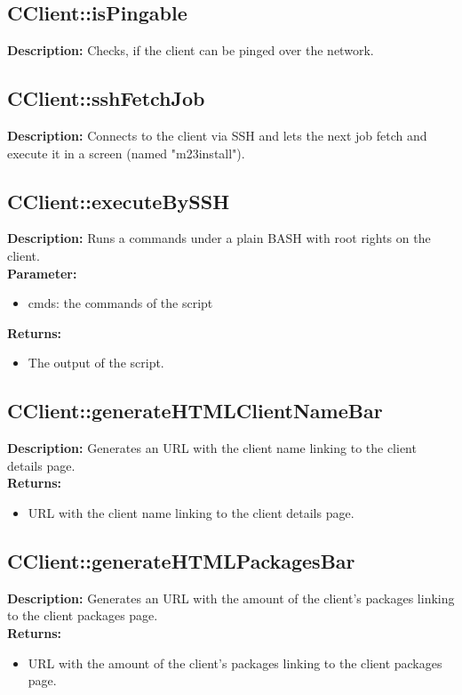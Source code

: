 \subsection{CClient::isPingable}
\textbf{Description:} Checks, if the client can be pinged over the network.\\

\subsection{CClient::sshFetchJob}
\textbf{Description:} Connects to the client via SSH and lets the next job fetch and execute it in a screen (named "m23install").\\

\subsection{CClient::executeBySSH}
\textbf{Description:} Runs a commands under a plain BASH with root rights on the client.\\
\textbf{Parameter:}
\begin{itemize}
\item cmds: the commands of the script 
\end{itemize}
\textbf{Returns:}
\begin{itemize}
\item The output of the script.
\end{itemize}

\subsection{CClient::generateHTMLClientNameBar}
\textbf{Description:} Generates an URL with the client name linking to the client details page.\\
\textbf{Returns:}
\begin{itemize}
\item URL with the client name linking to the client details page.
\end{itemize}

\subsection{CClient::generateHTMLPackagesBar}
\textbf{Description:} Generates an URL with the amount of the client's packages linking to the client packages page.\\
\textbf{Returns:}
\begin{itemize}
\item URL with the amount of the client's packages linking to the client packages page.
\end{itemize}

